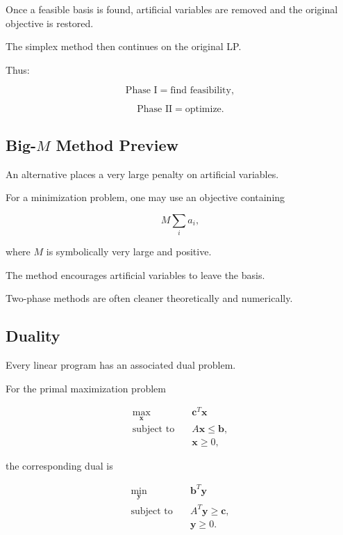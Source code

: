 Once a feasible basis is found, artificial variables are removed and the
original objective is restored.

The simplex method then continues on the original LP.

Thus:

\[
\boxed{
\text{Phase I}
=
\text{find feasibility},
}
\]

\[
\boxed{
\text{Phase II}
=
\text{optimize}.
}
\]

\subsection{Big-\(M\) Method Preview}
\label{subsec:big-m-method}

An alternative places a very large penalty on artificial variables.

For a minimization problem, one may use an objective containing

\[
\boxed{
M\sum_i a_i,
}
\]

where \(M\) is symbolically very large and positive.

The method encourages artificial variables to leave the basis.

Two-phase methods are often cleaner theoretically and numerically.

\subsection{Duality}
\label{subsec:linear-programming-duality}

Every linear program has an associated dual problem.

For the primal maximization problem

\[
\boxed{
\begin{aligned}
\max_{\mathbf{x}}
\quad&
\mathbf{c}^T\mathbf{x}
\\
\text{subject to}
\quad&
A\mathbf{x}\leq\mathbf{b},
\\
&
\mathbf{x}\geq0,
\end{aligned}
}
\]

the corresponding dual is

\[
\boxed{
\begin{aligned}
\min_{\mathbf{y}}
\quad&
\mathbf{b}^T\mathbf{y}
\\
\text{subject to}
\quad&
A^T\mathbf{y}\geq\mathbf{c},
\\
&
\mathbf{y}\geq0.
\end{aligned}
}
\]

